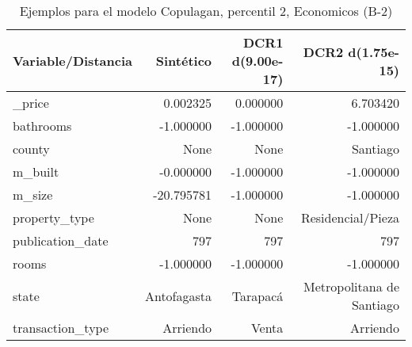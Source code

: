 \begin{table}[H]
\centering
\fontsize{10}{14}\selectfont
\caption{Ejemplos para el modelo Copulagan, percentil 2, Economicos (B-2)}
\label{table-example-economicos-b-2-copulagan-2p}
\begin{tabular}{|l|r|r|r|}
\hline
\rowcolor[gray]{0.8}
Variable/Distancia & Sintético & DCR1 d(9.00e-17) & DCR2 d(1.75e-15) \\
\hline \_price & \cellcolor[rgb]{0.9, 0.54, 0.52} 0.002325 & \cellcolor[rgb]{0.9, 0.54, 0.52} 0.000000 & 6.703420 \\
\hline bathrooms & \cellcolor[rgb]{0.9, 0.54, 0.52} -1.000000 & \cellcolor[rgb]{0.9, 0.54, 0.52} -1.000000 & \cellcolor[rgb]{0.9, 0.54, 0.52} -1.000000 \\
\hline county & \cellcolor[rgb]{0.9, 0.54, 0.52} None & \cellcolor[rgb]{0.9, 0.54, 0.52} None & Santiago \\
\hline m\_built & \cellcolor[rgb]{0.9, 0.54, 0.52} -0.000000 & \cellcolor[rgb]{0.9, 0.54, 0.52} -1.000000 & \cellcolor[rgb]{0.9, 0.54, 0.52} -1.000000 \\
\hline m\_size & \cellcolor[rgb]{0.9, 0.54, 0.52} -20.795781 & \cellcolor[rgb]{0.9, 0.54, 0.52} -1.000000 & \cellcolor[rgb]{0.9, 0.54, 0.52} -1.000000 \\
\hline property\_type & \cellcolor[rgb]{0.9, 0.54, 0.52} None & \cellcolor[rgb]{0.9, 0.54, 0.52} None & Residencial/Pieza \\
\hline publication\_date & \cellcolor[rgb]{0.9, 0.54, 0.52} 797 & \cellcolor[rgb]{0.9, 0.54, 0.52} 797 & \cellcolor[rgb]{0.9, 0.54, 0.52} 797 \\
\hline rooms & \cellcolor[rgb]{0.9, 0.54, 0.52} -1.000000 & \cellcolor[rgb]{0.9, 0.54, 0.52} -1.000000 & \cellcolor[rgb]{0.9, 0.54, 0.52} -1.000000 \\
\hline state & \cellcolor[rgb]{0.9, 0.54, 0.52} Antofagasta & Tarapacá & Metropolitana de Santiago \\
\hline transaction\_type & \cellcolor[rgb]{0.9, 0.54, 0.52} Arriendo & Venta & \cellcolor[rgb]{0.9, 0.54, 0.52} Arriendo \\
\hline
\end{tabular}
\end{table}
